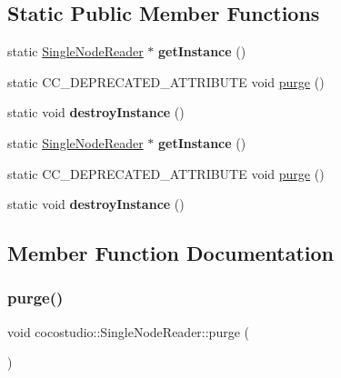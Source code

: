 \subsection*{Static Public Member Functions}
\begin{DoxyCompactItemize}
\item 
\mbox{\label{classcocostudio_1_1SingleNodeReader_a83983eee7e0524357bb73fa1e2598623}} 
static \hyperlink{classcocostudio_1_1SingleNodeReader}{Single\+Node\+Reader} $\ast$ {\bfseries get\+Instance} ()
\item 
static C\+C\+\_\+\+D\+E\+P\+R\+E\+C\+A\+T\+E\+D\+\_\+\+A\+T\+T\+R\+I\+B\+U\+TE void \hyperlink{classcocostudio_1_1SingleNodeReader_a15ca68d0e8b5e83c65225c112ff959b1}{purge} ()
\item 
\mbox{\label{classcocostudio_1_1SingleNodeReader_afbf2c81122ec95719eb803b51a46ebe1}} 
static void {\bfseries destroy\+Instance} ()
\item 
\mbox{\label{classcocostudio_1_1SingleNodeReader_ac502bf7a31f48b829b1666ff12589118}} 
static \hyperlink{classcocostudio_1_1SingleNodeReader}{Single\+Node\+Reader} $\ast$ {\bfseries get\+Instance} ()
\item 
static C\+C\+\_\+\+D\+E\+P\+R\+E\+C\+A\+T\+E\+D\+\_\+\+A\+T\+T\+R\+I\+B\+U\+TE void \hyperlink{classcocostudio_1_1SingleNodeReader_ab5e2f5f0a9e8c2e633ebad6e81a0e62d}{purge} ()
\item 
\mbox{\label{classcocostudio_1_1SingleNodeReader_a6606aa3928c72b773a1b0019d7d150b8}} 
static void {\bfseries destroy\+Instance} ()
\end{DoxyCompactItemize}


\subsection{Member Function Documentation}
\mbox{\label{classcocostudio_1_1SingleNodeReader_a15ca68d0e8b5e83c65225c112ff959b1}} 
\subsubsection{\texorpdfstring{purge()}{purge()}\hspace{0.1cm}{\footnotesize\ttfamily [1/2]}}
{\footnotesize\ttfamily void cocostudio\+::\+Single\+Node\+Reader\+::purge (\begin{DoxyParamCaption}{ }\end{DoxyParamCaption})\hspace{0.3cm}{\ttfamily [static]}}

